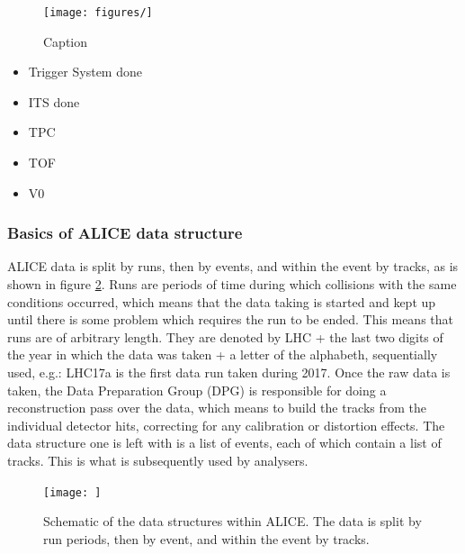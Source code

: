 \begin{figure}
    \centering
    \texttt{[image: figures/]}
    \caption{Caption}
    \label{fig:PID_TPC}
\end{figure}

\begin{itemize}
    \item Trigger System done
    \item ITS done
    \item TPC %
    \item TOF
	\item V0
\end{itemize}


\subsubsection{Basics of ALICE data structure}
ALICE data is split by runs, then by events, and within the event by tracks, as is shown in figure \ref{fig:ALICE_data_schematic}. Runs are periods of time during which collisions with the same conditions occurred, which means that the data taking is started and kept up until there is some problem which requires the run to be ended. This means that runs are of arbitrary length. They are denoted by LHC + the last two digits of the year in which the data was taken + a letter of the alphabeth, sequentially used, e.g.: LHC17a is the first data run taken during 2017. Once the raw data is taken, the Data Preparation Group (DPG) is responsible for doing a reconstruction pass over the data, which means to build the tracks from the individual detector hits, correcting for any calibration or distortion effects. The data structure  one is left with is a list of events, each of which contain a list of tracks. This is what is subsequently used by analysers. 

\begin{figure}
	\texttt{[image: ]}
	\centering
	\caption{Schematic of the data structures within ALICE. The data is split by run periods, then by event, and within the event by tracks. }
		\label{fig:ALICE_data_schematic}
\end{figure}
